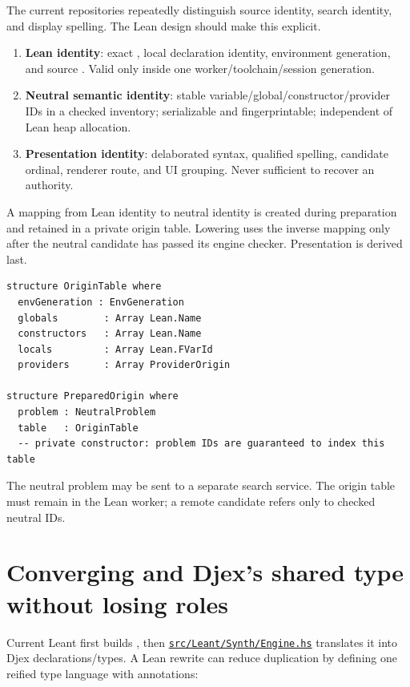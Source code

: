 \documentclass[10pt,letterpaper,oneside]{report}
\newcommand{\code}[1]{\texttt{\detokenize{#1}}}
\newcommand{\term}[1]{\textbf{#1}}
\def\LeantBase{https://github.com/VladimirReshetnikov/Leant/blob/89663ab01d24f61bc017b8c8b1f52c35573082e4/}
\newcommand{\lpath}[1]{\href{\LeantBase#1}{\nolinkurl{#1}}}
\begin{document}
The current repositories repeatedly distinguish source identity, search identity, and display spelling. The Lean design should make this explicit.

\begin{enumerate}
  \item \term{Lean identity}: exact \code{Name}, local declaration identity, environment generation, and source \code{Expr}. Valid only inside one worker/toolchain/session generation.
  \item \term{Neutral semantic identity}: stable variable/global/constructor/provider IDs in a checked inventory; serializable and fingerprintable; independent of Lean heap allocation.
  \item \term{Presentation identity}: delaborated syntax, qualified spelling, candidate ordinal, renderer route, and UI grouping. Never sufficient to recover an authority.
\end{enumerate}

A mapping from Lean identity to neutral identity is created during preparation and retained in a private origin table. Lowering uses the inverse mapping only after the neutral candidate has passed its engine checker. Presentation is derived last.

\begin{lstlisting}[language=Leanish]
structure OriginTable where
  envGeneration : EnvGeneration
  globals        : Array Lean.Name
  constructors   : Array Lean.Name
  locals         : Array Lean.FVarId
  providers      : Array ProviderOrigin

structure PreparedOrigin where
  problem : NeutralProblem
  table   : OriginTable
  -- private constructor: problem IDs are guaranteed to index this table
\end{lstlisting}

The neutral problem may be sent to a separate search service. The origin table must remain in the Lean worker; a remote candidate refers only to checked neutral IDs.

\section{Converging \code{Frag} and Djex's shared type without losing roles}

Current Leant first builds \code{Frag}, then \lpath{src/Leant/Synth/Engine.hs} translates it into Djex declarations/types. A Lean rewrite can reduce duplication by defining one reified type language with annotations:
\end{document}
